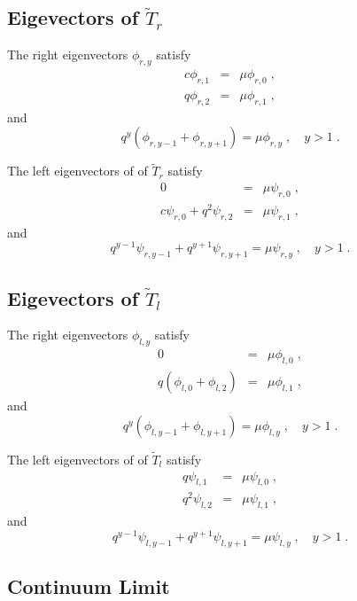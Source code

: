 \documentclass[a4paper,10pt]{article}
\begin{document}
\subsection{Eigevectors of $\tilde{T}_r$}

The right eigenvectors $\phi_{r,y}$ satisfy
\begin{eqnarray}
  c\phi_{r,1} & = & \mu \phi_{r,0} \;, \\
  q \phi_{r,2} & = & \mu \phi_{r,1} \;, 
\end{eqnarray}
and
\begin{equation}
  q^y (\phi_{r,y-1} + \phi_{r,y+1} ) = \mu \phi_{r,y} \;, \quad y > 1 \;.
\end{equation}

The left eigenvectors of of $\tilde{T}_r$ satisfy
\begin{eqnarray}
  0 & = & \mu \psi_{r,0} \;, \\
  c \psi_{r,0} + q^2 \psi_{r,2} & = & \mu \psi_{r,1} \;,
\end{eqnarray}
and
\begin{equation}
  q^{y-1} \psi_{r,y-1} + q^{y+1} \psi_{r,y+1} = \mu \psi_{r,y} \;, \quad y > 1 \;.
\end{equation}


\subsection{Eigevectors of $\tilde{T}_l$}

The right eigenvectors $\phi_{l,y}$ satisfy
\begin{eqnarray}
  0 & = & \mu \phi_{l,0} \;, \\
  q (\phi_{l,0} + \phi_{l,2}) & = & \mu \phi_{l,1} \;, 
\end{eqnarray}
and
\begin{equation}
  q^y (\phi_{l,y-1} + \phi_{l,y+1} ) = \mu \phi_{l,y} \;, \quad y > 1 \;.
\end{equation}

The left eigenvectors of of $\tilde{T}_l$ satisfy
\begin{eqnarray}
  q \psi_{l,1} & = & \mu \psi_{l,0} \;, \\
  q^2 \psi_{l,2} & = & \mu \psi_{l,1} \;,
\end{eqnarray}
and
\begin{equation}
  q^{y-1} \psi_{l,y-1} + q^{y+1} \psi_{l,y+1} = \mu \psi_{l,y} \;, \quad y > 1 \;.
\end{equation}

\subsection{Continuum Limit}
\end{document}
